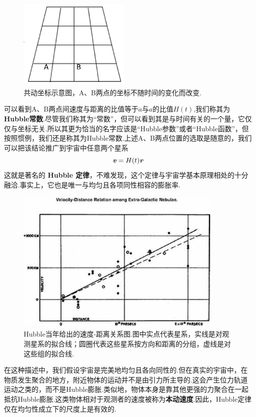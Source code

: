 \documentclass[a4paper]{book}
\newcommand{\xtjc}[1]{\textbf{\textit{#1}}}
\begin{document}
\begin{figure}[!h]
	\centering
	\includegraphics[width=5.36cm,height=4.4cm]{figures/坐标.eps}
	\caption{共动坐标示意图，A、B两点的坐标不随时间的变化而改变.}
\end{figure} 
可以看到A、B两点间速度与距离的比值等于$\dot{a}$与$a$的比值$H(t)$,我们称其为\textbf{Hubble常数}.尽管我们称其为“常数”，但可以看到其是与时间有关的一个量，它仅仅与坐标无关.所以其更为恰当的名字应该是“Hubble参数”或者“Hubble函数”，但按照惯例，我们还是称其为Hubble常数.上述A、B两点位置的选取是随意的，我们可以把该结论推广到宇宙中任意两个星系
\begin{equation}\label{1.4}
	\xtjc{v}=H(t)\xtjc{r}
\end{equation}
这就是著名的 \textbf{Hubble 定律}，不难发现，这个定律与宇宙学基本原理相处的十分融洽.事实上，它也是唯一与均匀且各项同性相容的膨胀率.\par 
\begin{figure}[!h]
	\centering
	\includegraphics[width=10cm,height=7cm]{figures/观测.eps}
	\caption{Hubble当年给出的速度-距离关系图.图中实点代表星系，实线是对观测星系的拟合线；圆圈代表这些星系按方向和距离的分组，虚线是对这些组的拟合线.}
\end{figure}
在这种描述中，我们假设宇宙是完美地均匀且各向同性的.但在真实的宇宙中，在物质发生聚合的地方，附近物体的运动并不是由引力所主导的.这会产生位力轨道运动之类的，而不是Hubble膨胀.类似地，物体本身是靠其他更强的力聚合在一起抵抗Hubble膨胀.这类物体相对于观测者的速度被称为\textbf{本动速度}.因此，Hubble定律仅在均匀性成立下的尺度上是有效的.\par 
\end{document}
